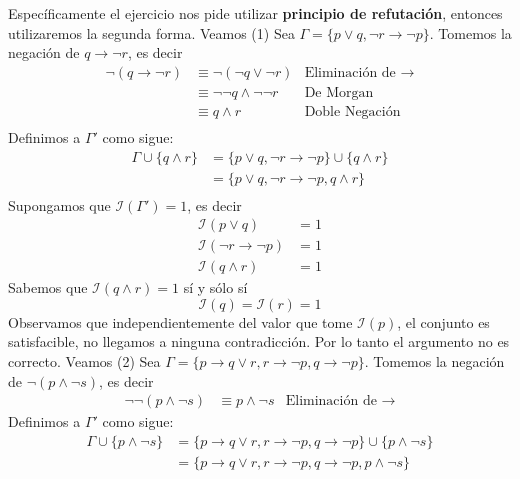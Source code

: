 \documentclass[a4paper]{article}
\begin{document}
Específicamente el ejercicio nos pide utilizar \textbf{principio de refutación}, entonces utilizaremos
la segunda forma.
\newline 
Veamos (1)
\newline
Sea \(\Gamma = \{ p \lor q, \lnot r \to \lnot p  \}\). Tomemos la negación de \(q \to \lnot r\), es decir
\begin{align*}
    \neg \left(q \to \lnot r\right) &\equiv \neg \left(\neg q \lor \lnot r\right)  &\text{Eliminación de \(\to\)} \\
                                    &\equiv \neg \neg q \land \neg \lnot r  &\text{De Morgan} \\
                                    &\equiv q \land r &\text{Doble Negación} \\
\end{align*}
Definimos a \(\Gamma'\) como sigue:
\begin{align*}
    \Gamma \cup \{ q \land r \} &= \{ p \lor q, \lnot r \to \lnot p  \} \cup \{ q \land r \} \\
                                &= \{ p \lor q, \lnot r \to \lnot p, q \land r \} \\
\end{align*}
Supongamos que \(\mathcal{I}\left(\Gamma'\right) = 1\), es decir
\begin{align*}
    \mathcal{I}\left(p \lor q\right) &= 1 \\
    \mathcal{I}\left(\lnot r \to \lnot p\right) &= 1 \\
    \mathcal{I}\left(q \land r\right) &= 1
\end{align*}
Sabemos que \(\mathcal{I}\left(q \land r\right) = 1\) sí y sólo sí
\[
    \mathcal{I}\left(q\right) = \mathcal{I}\left(r\right) = 1
\]
Observamos que independientemente del valor que tome \(\mathcal{I}\left(p\right)\), el conjunto
es satisfacible, no llegamos a ninguna contradicción. Por lo tanto el argumento no es correcto.
\newline
Veamos (2)
\newline
Sea \(\Gamma = \{  p \to q \lor r, r \to \lnot p, q \to \lnot p \}\). Tomemos la negación de 
\(\lnot (p \land \lnot s)\), es decir
\begin{align*}
    \neg \lnot (p \land \lnot s) &\equiv p \land \lnot s  &\text{Eliminación de \(\to\)}
\end{align*}
Definimos a \(\Gamma'\) como sigue:
\begin{align*}
    \Gamma \cup \{ p \land \lnot s \} &= \{p \to q \lor r, r \to \lnot p, q \to \lnot p  \} \cup \{ p \land \lnot s \} \\
                                &= \{ p \to q \lor r, r \to \lnot p, q \to \lnot p, p \land \lnot s \} \\
\end{align*}
\end{document}
